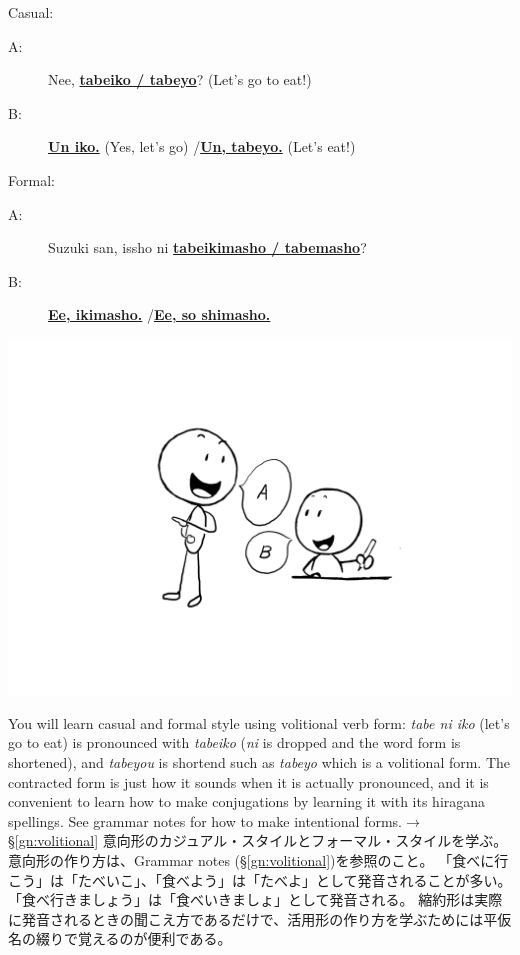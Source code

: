 \documentclass[uplatex,dvipdfmx,b5paper,english,10pt]{jsbook}
\begin{document}
\begin{description}
\item Casual:
\begin{description}
 \item[A:] Nee, \underline{{\bfseries tabeiko / tabeyo}}? (Let's go to eat!)
 \item[B:] \underline{{\bfseries Un iko.}} (Yes, let's go) /\underline{{\bfseries Un, tabeyo.}} (Let's eat!)
\end{description}
\item Formal:
\begin{description}
 \item[A:] Suzuki san, issho ni \underline{{\bfseries tabeikimasho / tabemasho}}?
 \item[B:] \underline{{\bfseries Ee, ikimasho.}} /\underline{{\bfseries Ee, so shimasho.}}
\end{description}
\end{description}

\begin{center}
\includegraphics[trim=250 140 220 150, clip, width=.25\hsize]{img/naturalspeaking06.png}
\end{center}
\vspace*{0\baselineskip}

\begin{toianswer}
\ifEnglish
You will learn casual and formal style using volitional verb form:
{\it tabe ni iko\/} (let's go to eat) is pronounced with {\it tabeiko\/} ({\it ni\/} is dropped and the word form is shortened), and {\it tabeyou\/} is shortend such as {\it tabeyo\/} which is a volitional form.
The contracted form is just how it sounds when it is actually pronounced, and it is convenient to learn how to make conjugations by learning it with its hiragana spellings.
See grammar notes for how to make intentional forms.$\rightarrow$ \S\ref{gn:volitional}
\else
意向形のカジュアル・スタイルとフォーマル・スタイルを学ぶ。
意向形の作り方は、Grammar notes (\S\ref{gn:volitional})を参照のこと。
「食べに行こう」は「たべいこ」、「食べよう」は「たべよ」として発音されることが多い。
「食べ行きましょう」は「食べいきましょ」として発音される。
縮約形は実際に発音されるときの聞こえ方であるだけで、活用形の作り方を学ぶためには平仮名の綴りで覚えるのが便利である。
\fi
\end{toianswer}
\end{document}
